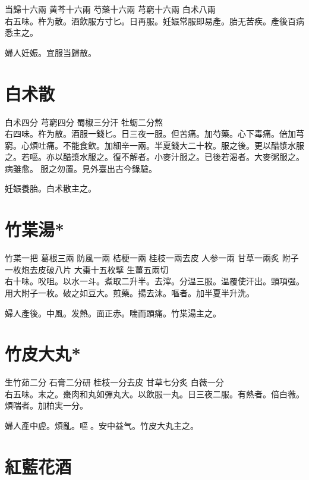 当歸{\scriptsize 十六兩} 黄芩{\scriptsize 十六兩} 芍藥{\scriptsize 十六兩} 芎窮{\scriptsize 十六兩} 白术{\scriptsize 八兩}\\
右五味。杵为散。酒飲服方寸匕。日再服。妊娠常服即易產。胎无苦疾。產後百病悉主之。

婦人妊娠。宜服当歸散。

\section{白术散}

白术{\scriptsize 四分} 芎窮{\scriptsize 四分} 蜀椒{\scriptsize 三分汗} 牡蛎{\scriptsize 二分熬} \\
右四味。杵为散。酒服一錢匕。日三夜一服。但苦痛。加芍藥。心下毒痛。倍加芎窮。心煩吐痛。不能食飲。加細辛一兩。半夏錢大二十枚。服之後。更以醋漿水服之。若嘔。亦以醋漿水服之。復不解者。小麥汁服之。已後若渴者。大麥粥服之。病雖愈。{\sungii 𥁞}服之勿置。{\scriptsize 見外臺出古今錄驗。}

妊娠養胎。白术散主之。

\section{竹枼湯*}

竹枼{\scriptsize 一把} 葛根{\scriptsize 三兩} 防風{\scriptsize 一兩} 桔梗{\scriptsize 一兩} 桂枝{\scriptsize 一兩去皮} 人参{\scriptsize 一兩} 甘草{\scriptsize 一兩炙} 附子{\scriptsize 一枚炮去皮破八片} 大棗{\scriptsize 十五枚擘} 生薑{\scriptsize 五兩切}\\
右十味。㕮咀。以水一斗。煮取二升半。去滓。分温三服。温覆使汗出。頸項强。用大附子一枚。破之如豆大。煎藥。揚去沫。嘔者。加半夏半升洗。

婦人產後。中風。发熱。面{\khaai 正}赤。喘而頭痛。竹枼湯主之。

\section{竹皮大丸*}

生竹茹{\scriptsize 二分} 石膏{\scriptsize 二分研} 桂枝{\scriptsize 一分去皮} 甘草{\scriptsize 七分炙} 白薇{\scriptsize 一分}\\
右五味。末之。棗肉和丸如彈丸大。以飲服一丸。日三夜二服。有熱者。倍白薇。煩喘者。加柏実一分。

婦人產中虗。煩亂。嘔{\sungii 𠱘}。安中益气。竹皮大丸主之。

\section{紅藍花酒}

